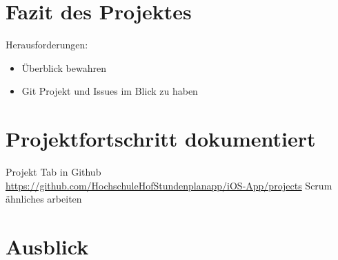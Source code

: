 \section{Fazit des Projektes}
Herausforderungen:
\begin{itemize}
\item Überblick bewahren
\item Git Projekt und Issues im Blick zu haben
\end{itemize}


\section{Projektfortschritt dokumentiert}
Projekt Tab in Github\\
\url{https://github.com/HochschuleHofStundenplanapp/iOS-App/projects}
Scrum ähnliches arbeiten




\section{Ausblick}

